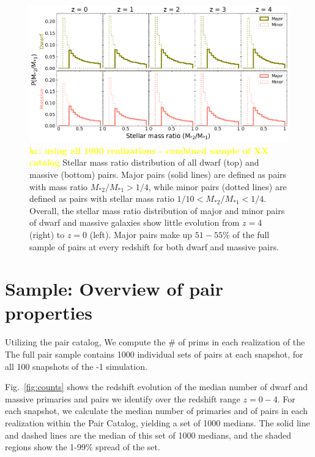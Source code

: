 \documentclass[twocolumn]{aastex631}
\newcommand{\kc}[1]{\textcolor{yellow}{\textbf{kc: #1}} }
\newcommand{\ms}[1]{\ensuremath{M_{*{#1}}}}
\begin{document}
\begin{figure}[htb]
    \centering
    \includegraphics[width=\textwidth]{smrdist_1000.png}
    \caption{\kc{using all 1000 realizations - combined sample of XX catalog} Stellar mass ratio distribution of all dwarf (top) and massive (bottom) pairs. Major pairs (solid lines) are defined as pairs with mass ratio $\ms{2}/\ms{1} > 1/4$, while minor pairs (dotted lines) are defined as pairs with stellar mass ratio $1/10<\ms{2}/\ms{1}<1/4$. Overall, the stellar mass ratio distribution of major and minor pairs of dwarf and massive galaxies show little evolution from $z=4$ (right) to $z=0$ (left). 
    Major pairs make up $51-55\%$ of the full sample of pairs at every redshift for both dwarf and massive pairs.}
    \label{fig:massratio}
\end{figure}

\section{Sample: Overview of pair properties} \label{sec:pairprops}
    Utilizing the pair catalog, We compute the \# of prims in each realization of the 
    The full pair sample contains 1000 individual sets of pairs at each snapshot, for all 100 snapshots of the -1 simulation. 
   


    Fig.~\ref{fig:counts} shows the redshift evolution of the median number of dwarf and massive primaries and pairs we identify over the redshift range $z=0-4$.   
    For each snapshot, we calculate the median number of primaries and of pairs in each realization within the Pair Catalog, yielding a set of 1000 medians. 
    The solid line and dashed lines are the median of this set of 1000 medians, and the shaded regions show the 1-99\% spread of the set.
    
\end{document}
